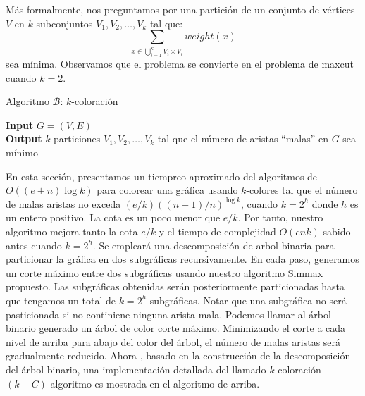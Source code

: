 \documentclass[letterpaper]{article}
\begin{document}
Más formalmente, nos preguntamos por una partición de un conjunto de vértices $V$ en $k$ subconjuntos
$V_1, V_2, \ldots, V_k$ tal que:
\[
    \sum_{x\in \bigcup_{i=1}^{k} V_i \times V_i} weight(x)
\]
sea mínima. Observamos que el problema se convierte en el problema de maxcut cuando $k=2$.
\begin{algorithm}[H]
    \caption{Algoritmo $\mathcal{B}$: $k$-coloración}
    \hspace*{\algorithmicindent} \textbf{Input} $G=(V,E)$ \\
    \hspace*{\algorithmicindent} \textbf{Output} $k$ particiones $V_1,V_2,\ldots,V_k$ tal que el número de aristas ``malas'' en $G$ sea mínimo\\
    \begin{algorithmic}
        \ELSE
            \ENDIF
            \ENDWHILE
    \ENDWHILE
    \end{algorithmic}
\end{algorithm}

En esta sección, presentamos un tiempreo aproximado del algoritmos de $O((e+n)\log k)$ para colorear
una gráfica usando $k$-colores tal que el número de malas aristas no exceda $(e/k)((n-1)/n)^{\log k}$,
cuando $k = 2^h$ donde $h$ es un entero positivo. La cota es un poco menor que $e/k$. Por tanto,
nuestro algoritmo mejora tanto la cota $e/k$ y el tiempo de complejidad $O(enk)$ sabido antes cuando
$k = 2^h$. Se empleará una descomposición de arbol binaria para particionar la gráfica en dos
subgráficas recursivamente. En cada paso, generamos un corte máximo entre dos subgráficas usando nuestro
algoritmo Simmax propuesto. Las subgráficas obtenidas serán posteriormente particionadas hasta que tengamos
un total de $k = 2^h$ subgráficas. Notar que una subgráfica no será pasticionada si no continiene ninguna
arista mala. Podemos llamar al árbol binario generado un árbol de color corte máximo. Minimizando el
corte a cada nivel de arriba para abajo del color del árbol, el número de malas aristas será
gradualmente reducido. Ahora , basado en la construcción de la descomposición del árbol binario, una
implementación detallada del llamado $k$-coloración $(k-C)$ algoritmo es mostrada en el algoritmo de arriba.
\end{document}
